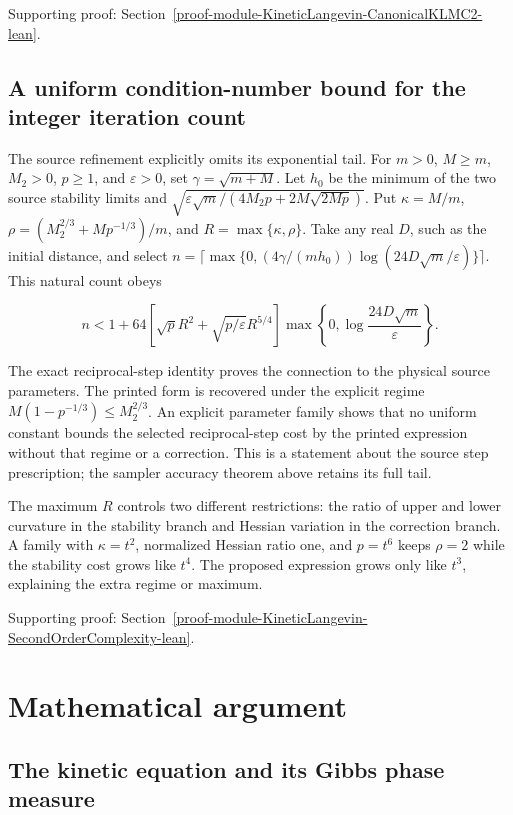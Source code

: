 \documentclass[11pt,a4paper]{report}
\begin{document}
{\small\color{gray}Supporting proof: Section~\ref{proof-module-KineticLangevin-CanonicalKLMC2-lean}.\par}
\section{\texorpdfstring{A uniform condition-number bound for the integer iteration count}{A uniform condition-number bound for the integer iteration count}}


The source refinement explicitly omits its exponential tail. For \(m>0\), \(M\ge m\), \(M_2>0\), \(p\ge1\), and \(\varepsilon>0\), set \(\gamma=\sqrt{m+M}\). Let \(h_0\) be the minimum of the two source stability limits and \(\sqrt{\varepsilon\sqrt m/(4M_2p+2M\sqrt{2Mp})}\). Put \(\kappa=M/m\), \(\rho=(M_2^{2/3}+Mp^{-1/3})/m\), and \(R=\max\{\kappa,\rho\}\). Take any real \(D\), such as the initial distance, and select \(n=\lceil\max\{0,(4\gamma/(mh_0))\log(24D\sqrt m/\varepsilon)\}\rceil\). This natural count obeys

\[n<1+64\left[\sqrt p R^2+\sqrt{p/\varepsilon}R^{5/4}\right]\max\left\{0,\log\frac{24D\sqrt m}{\varepsilon}\right\}.\]

The exact reciprocal-step identity proves the connection to the physical source parameters. The printed form is recovered under the explicit regime \(M(1-p^{-1/3})\le M_2^{2/3}\). An explicit parameter family shows that no uniform constant bounds the selected reciprocal-step cost by the printed expression without that regime or a correction. This is a statement about the source step prescription; the sampler accuracy theorem above retains its full tail.



The maximum \(R\) controls two different restrictions: the ratio of upper and lower curvature in the stability branch and Hessian variation in the correction branch. A family with \(\kappa=t^2\), normalized Hessian ratio one, and \(p=t^6\) keeps \(\rho=2\) while the stability cost grows like \(t^4\). The proposed expression grows only like \(t^3\), explaining the extra regime or maximum.


{\small\color{gray}Supporting proof: Section~\ref{proof-module-KineticLangevin-SecondOrderComplexity-lean}.\par}
\chapter{Mathematical argument}
\section{\texorpdfstring{The kinetic equation and its Gibbs phase measure}{The kinetic equation and its Gibbs phase measure}}
\end{document}
